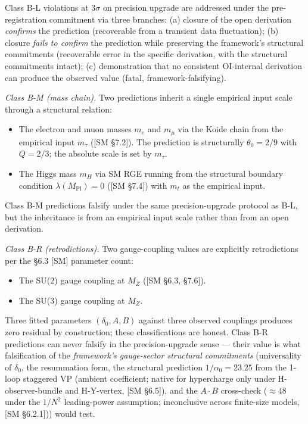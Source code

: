 \documentclass[
]{article}
\providecommand{\tightlist}{%
  \setlength{\itemsep}{0pt}\setlength{\parskip}{0pt}}
\begin{document}
Class B-L violations at \(3\sigma\) on precision upgrade are addressed
under the pre-registration commitment via three branches: (a) closure of
the open derivation \emph{confirms} the prediction (recoverable from a
transient data fluctuation); (b) closure \emph{fails to confirm} the
prediction while preserving the framework's structural commitments
(recoverable error in the specific derivation, with the structural
commitments intact); (c) demonstration that no consistent OI-internal
derivation can produce the observed value (fatal, framework-falsifying).

\emph{Class B-M (mass chain).} Two predictions inherit a single
empirical input scale through a structural relation:

\begin{itemize}
\tightlist
\item
  The electron and muon masses \(m_e\) and \(m_\mu\) via the Koide chain
  from the empirical input \(m_\tau\) ({[}SM §7.2{]}). The prediction is
  structurally \(\theta_0 = 2/9\) with \(Q = 2/3\); the absolute scale
  is set by \(m_\tau\).
\item
  The Higgs mass \(m_H\) via SM RGE running from the structural boundary
  condition \(\lambda(M_{\text{Pl}}) = 0\) ({[}SM §7.4{]}) with \(m_t\)
  as the empirical input.
\end{itemize}

Class B-M predictions falsify under the same precision-upgrade protocol
as B-L, but the inheritance is from an empirical input scale rather than
from an open derivation.

\emph{Class B-R (retrodictions).} Two gauge-coupling values are
explicitly retrodictions per the §6.3 {[}SM{]} parameter count:

\begin{itemize}
\tightlist
\item
  The SU(2) gauge coupling at \(M_Z\) ({[}SM §6.3, §7.6{]}).
\item
  The SU(3) gauge coupling at \(M_Z\).
\end{itemize}

Three fitted parameters \((\delta_0, A, B)\) against three observed
couplings produces zero residual by construction; these classifications
are honest. Class B-R predictions can never falsify in the
precision-upgrade sense --- their value is what falsification of the
\emph{framework's gauge-sector structural commitments} (universality of
\(\delta_0\), the resummation form, the structural prediction
\(1/\alpha_0 = 23.25\) from the 1-loop staggered VP (ambient
coefficient; native for hypercharge only under H-observer-bundle and
H-Y-vertex, {[}SM §6.5{]}), and the \(A \cdot B\) cross-check
(\(\approx 48\) under the \(1/N^2\) leading-power assumption;
inconclusive across finite-size models, {[}SM §6.2.1{]})) would test.
\end{document}
